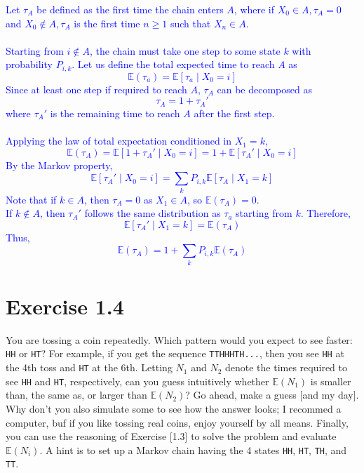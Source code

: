 \documentclass{article}
\begin{document}
\textcolor{blue}{Let $\tau_A$ be defined as the first time the chain enters $A$, where if $X_0\in A, \tau_A=0$ and $X_0\notin A, \tau_A$ is the first time $n \geq 1$ such that $X_n \in A$. \\ \\ Starting from $i\notin A$, the chain must take one step to some state $k$ with probability $P_{i,k}$. Let us define the total expected time to reach $A$ as $$\mathbb{E}(\tau_a)=\mathbb{E}[\tau_a \mid X_0=i]$$
Since at least one step if required to reach $A$, $\tau_A$ can be decomposed as $$\tau_A = 1 + \tau_A'$$ where $\tau_A'$ is the remaining time to reach $A$ after the first step. \\ \\
Applying the law of total expectation conditioned in $X_1=k$, $$\mathbb{E}(\tau_A)=\mathbb{E}[1+\tau_A' \mid X_0=i] = 1 + \mathbb{E}[\tau_A' \mid X_0 =i]$$
By the Markov property, $$\mathbb{E}[\tau_A' \mid  X_0=i] = \sum_k P_{i,k}\mathbb{E}[\tau_A \mid X_1=k]$$
Note that if $k\in A$, then $\tau_A=0$ as $X_1 \in A$, so $\mathbb{E}(\tau_A)=0$. \\ 
If $k\notin A$, then $\tau_A'$ follows the same distribution as $\tau_a$ starting from $k$. Therefore, $$\mathbb{E}[\tau_A' \mid X_1= k]=\mathbb{E}(\tau_A)$$
Thus, $$\mathbb{E}(\tau_A)=1+\sum_k P_{i,k}\mathbb{E}(\tau_A)$$}

\section*{Exercise 1.4} 
You are tossing a coin repeatedly. Which
pattern would you expect to see faster: \texttt{HH} or \texttt{HT}?
For example, if you get the sequence \texttt{TTHHHTH...}, then you
see \texttt{HH} at the 4th toss and \texttt{HT} at the 6th. Letting
$N_1$ and $N_2$ denote the times required to see \texttt{HH} and
\texttt{HT}, respectively, can you guess intuitively whether $\mathbb{E}(N_1)$
is smaller than, the same as, or larger than $\mathbb{E}(N_2)$? Go ahead, make
a guess [and my day]. Why don’t you also simulate some to see how the answer
looks; I recommed a computer, buf if you like tossing real coins, enjoy yourself by all means. Finally, you can use the reasoning of Exercise [1.3] to solve the
problem and evaluate $\mathbb{E}(N_i)$. A hint is to set up a Markov chain
having the 4 states \texttt{HH}, \texttt{HT}, \texttt{TH}, and
\texttt{TT}.
\end{document}
